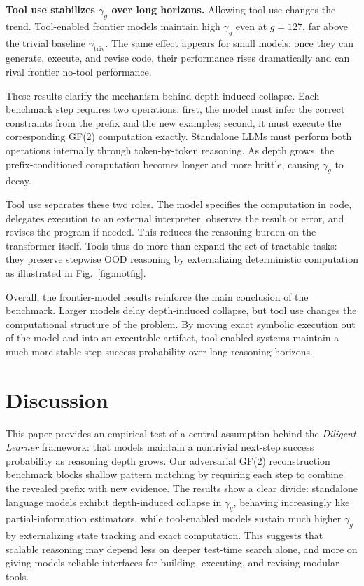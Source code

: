 \documentclass{article}
\begin{document}
{\bf Tool use stabilizes $\gamma_g$ over long horizons.\enspace} Allowing tool use changes the trend. Tool-enabled frontier models maintain high $\gamma_g$ even at $g=127$, far above the trivial baseline $\gamma_{\mathrm{triv}}$. The same effect appears for small models: once they can generate, execute, and revise code, their performance rises dramatically and can rival frontier no-tool performance.

These results clarify the mechanism behind depth-induced collapse. Each benchmark step requires two operations: first, the model must infer the correct constraints from the prefix and the new examples; second, it must execute the corresponding GF(2) computation exactly. Standalone LLMs must perform both operations internally through token-by-token reasoning. As depth grows, the prefix-conditioned computation becomes longer and more brittle, causing $\gamma_g$ to decay.

Tool use separates these two roles. The model specifies the computation in code, delegates execution to an external interpreter, observes the result or error, and revises the program if needed. This reduces the reasoning burden on the transformer itself. Tools thus do more than expand the set of tractable tasks: they preserve stepwise OOD reasoning by externalizing deterministic computation as illustrated in Fig.~\ref{fig:motfig}.


Overall, the frontier-model results reinforce the main conclusion of the benchmark. Larger models delay depth-induced collapse, but tool use changes the computational structure of the problem. By moving exact symbolic execution out of the model and into an executable artifact, tool-enabled systems maintain a much more stable step-success probability over long reasoning horizons.


\section{Discussion}

This paper provides an empirical test of a central assumption behind the \textit{Diligent Learner} framework: that models maintain a nontrivial next-step success probability as reasoning depth grows. Our adversarial GF(2) reconstruction benchmark blocks shallow pattern matching by requiring each step to combine the revealed prefix with new evidence. The results show a clear divide: standalone language models exhibit depth-induced collapse in $\gamma_g$, behaving increasingly like partial-information estimators, while tool-enabled models sustain much higher $\gamma_g$ by externalizing state tracking and exact computation. This suggests that scalable reasoning may depend less on deeper test-time search alone, and more on giving models reliable interfaces for building, executing, and revising modular tools.
\end{document}
